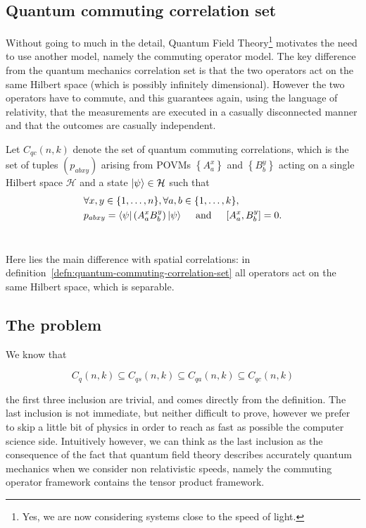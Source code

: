 
\subsection{Quantum commuting correlation set}\label{sec:quantum-commuting-correlation-set}
Without going to much in the detail, Quantum Field Theory\footnote{Yes, we are now considering systems close to the speed of light.} motivates the need to use another model, namely the commuting operator model. The key difference from the quantum mechanics correlation set is that the two operators act on the same Hilbert space (which is possibly infinitely dimensional). However the two operators have to commute, and this guarantees again, using the language of relativity, that the measurements are executed in a casually disconnected manner and that the outcomes are casually independent.


\begin{defn}\label{defn:quantum-commuting-correlation-set}
Let $C_{q c}(n, k)$ denote the set of quantum commuting correlations, which is the set of tuples $\left(p_{a b x y}\right)$ arising from POVMs $\left\{A_{a}^{x}\right\}$ and $\left\{B_{b}^{y}\right\}$ acting on a single Hilbert space $\mathcal{H}$ and a state $\ket{\psi} \in \mathcal{H}$ such that
\begin{equation}
    \begin{split}
&\forall x, y \in\{1, \ldots, n\}, \forall a, b \in\{1, \ldots, k\}, \quad \\
 &p_{a b x y}=\bra{\psi}\left(A_{a}^{x} B_{b}^{y}\right) \ket{\psi} \quad \text { and } \quad\left[A_{a}^{x}, B_{b}^{y}\right]=0.
    \end{split}
\end{equation} ~\cite{mipre}
\end{defn}
Here lies the main difference with spatial correlations: in definition~\ref{defn:quantum-commuting-correlation-set} all operators act on the same Hilbert space, which is separable. 

\subsection{The problem}

We know that

\begin{equation}
    C_{q}(n, k) \subseteq C_{q s}(n, k) \subseteq C_{q a}(n, k) \subseteq C_{q c}(n, k)
\end{equation}

the first three inclusion are trivial, and comes directly from the definition. The last inclusion is not immediate, but neither difficult to prove, however we prefer to skip a little bit of physics in order to reach as fast as possible the computer science side. Intuitively however, we can think as the last inclusion as the consequence of the fact that quantum field theory describes accurately quantum mechanics when we consider non relativistic speeds, namely the commuting operator framework contains the tensor product framework.


